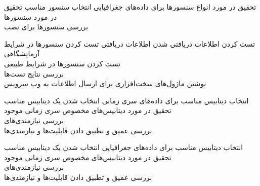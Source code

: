 \begin{wbsbox}{}
\begin{wbssub}
{تحقیق در مورد انواع سنسور‌ها برای داده‌های جغرافیایی}
{انتخاب سنسور مناسب}
\task
تحقیق در مورد سنسور‌ها \\
\task
بررسی سنسور‌ها برای نصب
\end{wbssub}

\begin{wbssub}
{تست کردن اطلاعات دریافتی}
{ شدن اطلاعات دریافتی}
\task
تست کردن سنسورها در شرایط آزمایشگاهی \\
\task
تست کردن سنسورها در شرایط طبیعی \\
\task
بررسی نتایج تست‌ها \\
\task
نوشتن ماژول‌های سخت‌افزاری برای ارسال اطلاعات به وب ‌سرویس
\end{wbssub}

\begin{wbssub}
{انتخاب دیتابیس مناسب برای داده‌های سری زمانی}
{انتخاب شدن یک دیتابیس مناسب}
\task
تحقیق در مورد دیتابیس‌‌های مخصوص سری زمانی موجود \\
\task
بررسی نیازمندی‌های 
 \\
\task
بررسی عمیق و تطبیق‌ دادن قابلیت‌ها و نیازمندی‌ها
\end{wbssub}

\begin{wbssub}
{انتخاب دیتابیس مناسب برای داده‌های جغرافیایی}
{انتخاب شدن یک دیتابیس مناسب}
\task
تحقیق در مورد دیتابیس‌‌های مخصوص سری زمانی موجود \\
\task
بررسی نیازمندی‌های 
 \\
\task
بررسی عمیق و تطبیق‌ دادن قابلیت‌ها و نیازمندی‌ها
\end{wbssub}
\end{wbsbox}
